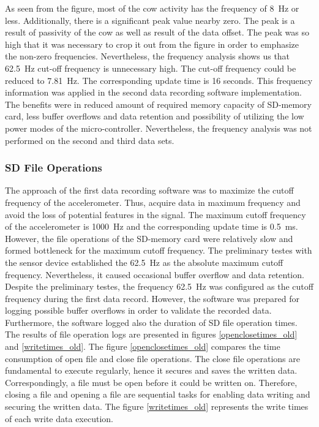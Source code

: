 \documentclass[english,12pt,a4paper,pdftex,elec,utf8]{aaltothesis}
\begin{document}
As seen from the figure, most of the cow activity has the frequency of \SI{8}{\hertz} or less. Additionally, there is a significant peak value nearby zero. The peak is a result of passivity of the cow as well as result of the data offset. The peak was so high that it was necessary to crop it out from the figure in order to emphasize the non-zero frequencies. Nevertheless, the frequency analysis shows us that \SI{62.5}{\hertz} cut-off frequency is unnecessary high. The cut-off frequency could be reduced to \SI{7.81}{\hertz}. The corresponding update time is 16 seconds. This frequency information was applied in the second data recording software implementation. The benefits were in reduced amount of required memory capacity of SD-memory card, less buffer overflows and data retention and possibility of utilizing the low power modes of the micro-controller. Nevertheless, the frequency analysis was not performed on the second and third data sets.



\subsubsection{SD File Operations}

The approach of the first data recording software was to maximize the cutoff frequency of the accelerometer. Thus, acquire data in maximum frequency and avoid the loss of potential features in the signal. The maximum  cutoff frequency of the accelerometer is \SI{1000}{\hertz} and the corresponding update time is \SI{0.5}{\milli \second}. However, the file operations of the SD-memory card were relatively slow and formed bottleneck for the maximum cutoff frequency. The preliminary testes with the sensor device established the \SI{62.5}{\hertz} as the absolute maximum cutoff frequency. Nevertheless, it caused occasional buffer overflow and data retention. Despite the preliminary testes, the frequency \SI{62.5}{\hertz} was configured as the cutoff frequency during the first data record. However, the software was prepared for logging possible buffer overflows in order to validate the recorded data. Furthermore, the software logged also the duration of SD file operation times. The results of file operation logs are presented in figures \ref{openclosetimes_old} and \ref{writetimes_old}. The figure \ref{openclosetimes_old} compares the time consumption of open file and close file operations. The close file operations are fundamental  to execute regularly, hence it secures and saves the written data. Correspondingly, a file must be open before it could be written on. Therefore, closing a file and opening a file are sequential tasks for enabling data writing and securing the written data. The figure \ref{writetimes_old} represents the write times of each write data execution.
\end{document}
